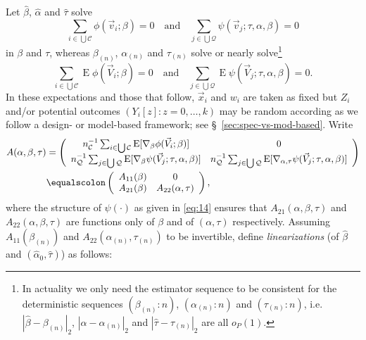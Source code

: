 \documentclass{article}
\newcommand{\eqdef}{\ensuremath{\equalscolon}}
\newcommand{\EE}{\operatorname{E}}
\begin{document}
Let $\hat\beta$, $\hat{\alpha}$ and $\hat\tau$ solve
\[\sum_{i\in \bigcup \mathcal{C}}\phi(\vec{v}_{i}; \beta )
  =0\quad\text{and}\quad
\sum_{j\in \bigcup \mathcal{Q}}\psi(\vec{v}_{j}; \tau,
\alpha, \beta )  =0
  \]
  in $\beta$ and $\tau$, whereas $\beta_{(n)}$, $\alpha_{(n)}$ and $\tau_{(n)}$ solve or nearly solve\footnote{%
In actuality we only need the estimator sequence to be consistent for the deterministic sequences $(\beta_{(n)}:n)$, $(\alpha_{(n)}:n)$ and $(\tau_{(n)}:n)$, i.e. $|\hat\beta - \beta_{(n)}|_{2}$, $|\hat{\alpha} - \alpha_{(n)}|_{2}$ and $|\hat\tau - \tau_{(n)}|_{2}$ are all $o_{P}(1)$.%
}
\[\sum_{i\in \bigcup \mathcal{C}}\EE\phi(\vec{V}_{i}; \beta )
  =0\quad\text{and}\quad
\sum_{j\in \bigcup \mathcal{Q}}\EE\psi(\vec{V}_{j}; \tau,
\alpha, \beta )  =0.
  \]
In these expectations and those that follow, $\vec{x}_{i}$ and $w_{i}$
are taken as fixed but $Z_{i}$ and/or potential outcomes $(Y_{i}[z]:
z=0, \ldots, k)$ may be random according as we follow a design- or
model-based framework; see \S~\ref{sec:spec-vs-mod-based}.
  Write
\begin{align}
\nonumber
    A(\alpha, \beta, \tau) &= \left(
      \begin{array}{cc}
        n_{\mathcal{C}}^{-1}\sum_{i\in \bigcup
        \mathcal{C}}\EE [\nabla_{\beta}\phi(\vec{V}_{i};
        \beta )]&0\\
        n_{\mathcal{Q}}^{-1}\sum_{j\in \bigcup
        \mathcal{Q}}\EE[ \nabla_{\beta}\psi(\vec{V}_{j};
        \tau, \alpha, \beta )]  & n_{\mathcal{Q}}^{-1}\sum_{j\in \bigcup
        \mathcal{Q}}\EE[ \nabla_{\alpha, \tau}\psi(\vec{V}_{j};
        \tau, \alpha, \beta )]
      \end{array}
                                  \right)\\
    \label{eq:13}
    &\eqdef \left(
      \begin{array}{cc}
        A_{11}(\beta)& 0\\
        A_{21}(\beta) & A_{22}(\alpha, \tau)
      \end{array}
\right),
  \end{align}
where the structure of $\psi(\cdot)$ as given in \eqref{eq:14} ensures
that $A_{21}(\alpha, \beta, \tau)$ and $A_{22}(\alpha, \beta, \tau)$
are functions only of $\beta$ and of $(\alpha, \tau)$
respectively. Assuming $A_{11}(\beta_{(n)})$ and $A_{22}(\alpha_{(n)},
\tau_{(n)})$ to be invertible, define \textit{linearizations} (of
$\hat\beta$ and $(\hat{\alpha}_{0}, \hat\tau)$) as follows:
\end{document}
